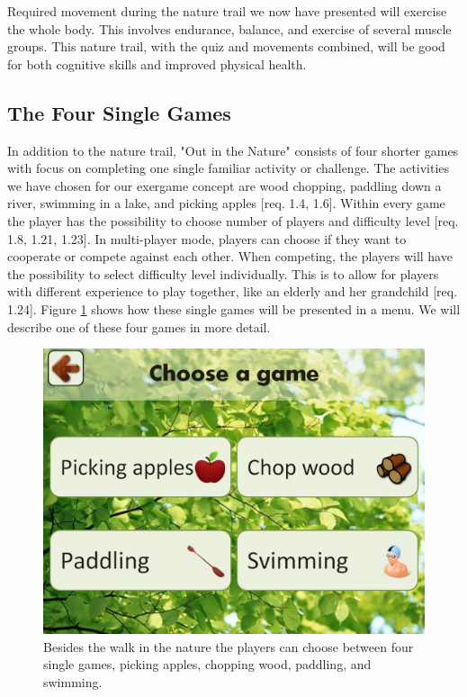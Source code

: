 Required movement during the nature trail we now have presented will exercise the whole body. This involves endurance, balance, and exercise of several muscle groups. This nature trail, with the quiz and movements combined, will be good for both cognitive skills and improved physical health.     

\subsection{The Four Single Games}
In addition to the nature trail, "Out in the Nature" consists of four shorter games with focus on completing one single familiar activity or challenge. The activities we have chosen for our exergame concept are wood chopping, paddling down a river, swimming in a lake, and picking apples [req. 1.4, 1.6]. Within every game the player has the possibility to choose number of players and difficulty level [req. 1.8, 1.21, 1.23]. In multi-player mode, players can choose if they want to cooperate or compete against each other. When competing, the players will have the possibility to select difficulty level individually. This is to allow for players with different experience to play together, like an elderly and her grandchild [req. 1.24]. Figure \ref{fig:velgSpill} shows how these single games will be presented in a menu. We will describe one of these four games in more detail.

\begin{figure} [H]
\centering
\includegraphics[scale=0.4]{chooseGame.jpg}
\caption[The four single games]{Besides the walk in the nature the players can choose between four single games, picking apples, chopping wood, paddling, and swimming.}
\label{fig:velgSpill}
\end{figure}

